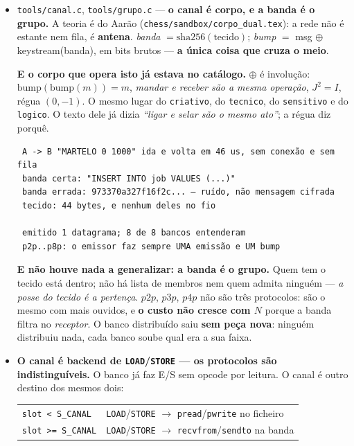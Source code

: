\documentclass[11pt]{article}
\newcommand{\code}[1]{\texttt{\small #1}}
\theoremstyle{plain}
\theoremstyle{remark}
\begin{document}
\begin{itemize}
Note-se que o \code{criativo} é \emph{hiperbólico} ($\det = -1$), não elíptico: o martelo usa dois
corpos, cada um no seu ofício --- o \code{criativo} para fatiar (a troca, que só reorganiza) e o
elíptico para decidir a share (a norma definida, onde não pode haver cone nulo). \emph{A dualidade
que arruma os bits não é a que julga o trabalho.}

\item \code{tools/canal.c}, \code{tools/grupo.c} --- \textbf{o canal é corpo, e a banda é o
grupo.} A teoria é do Aarão (\code{chess/sandbox/corpo\_dual.tex}): a rede não é estante nem fila,
é \textbf{antena}. \emph{banda} $=\mathrm{sha256}(\text{tecido})$; \emph{bump} $=$ msg
$\oplus$ keystream(banda), em bits brutos --- \textbf{a única coisa que cruza o meio}.

\textbf{E o corpo que opera isto já estava no catálogo.} $\oplus$ é involução:
$\text{bump}(\text{bump}(m)) = m$, \emph{mandar e receber são a mesma operação}, $J^2 = I$, régua
$(0,-1)$. O mesmo lugar do \code{criativo}, do \code{tecnico}, do \code{sensitivo} e do
\code{logico}. O texto dele já dizia \emph{``ligar e selar são o mesmo ato''}; a régua diz porquê.

\begin{verbatim}
 A -> B "MARTELO 0 1000" ida e volta em 46 us, sem conexão e sem fila
 banda certa: "INSERT INTO job VALUES (...)"
 banda errada: 973370a327f16f2c... — ruído, não mensagem cifrada
 tecido: 44 bytes, e nenhum deles no fio

 emitido 1 datagrama; 8 de 8 bancos entenderam
 p2p..p8p: o emissor faz sempre UMA emissão e UM bump
\end{verbatim}

\textbf{E não houve nada a generalizar: a banda é o grupo.} Quem tem o tecido está dentro; não há
lista de membros nem quem admita ninguém --- \emph{a posse do tecido é a pertença}. $p2p$, $p3p$,
$p4p$ não são três protocolos: são o mesmo com mais ouvidos, e \textbf{o custo não cresce com $N$}
porque a banda filtra no \emph{receptor}. O banco distribuído saiu \textbf{sem peça nova}: ninguém
distribuiu nada, cada banco soube qual era a sua faixa.

\item \textbf{O canal é backend de \code{LOAD}/\code{STORE} --- os protocolos são indistinguíveis.}
O banco já faz E/S sem opcode por leitura. O canal é outro destino dos mesmos dois:

\begin{center}\begin{tabular}{@{}ll@{}}
\code{slot < S\_CANAL} & \code{LOAD}/\code{STORE} $\to$ \code{pread}/\code{pwrite} no ficheiro\\
\code{slot >= S\_CANAL} & \code{LOAD}/\code{STORE} $\to$ \code{recvfrom}/\code{sendto} na banda\\
\end{tabular}\end{center}


\end{itemize}
\end{document}
